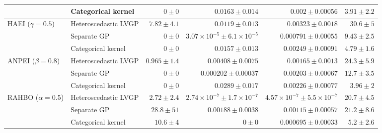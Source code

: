 \begin{table}[htbp]
\begin{tabular}{llrrrr}
 & Categorical kernel & \colorbox{green!20}{{\boldmath$0 \pm 0$}} & $0.0163 \pm 0.014$ & $0.002 \pm 0.00056$ & {\boldmath$3.91 \pm 2.2$} \\
\midrule
HAEI ($\gamma=0.5$) & Heteroscedastic LVGP & $7.82 \pm 4.1$ & $0.0119 \pm 0.013$ & $0.00323 \pm 0.0018$ & $30.6 \pm 5$ \\
 & Separate GP & \colorbox{green!20}{{\boldmath$0 \pm 0$}} & {\boldmath$3.07{\times}10^{-5} \pm 6.1{\times}10^{-5}$} & {\boldmath$0.000791 \pm 0.00055$} & $9.43 \pm 2.5$ \\
 & Categorical kernel & \colorbox{green!20}{{\boldmath$0 \pm 0$}} & $0.0157 \pm 0.013$ & $0.00249 \pm 0.00091$ & {\boldmath$4.79 \pm 1.6$} \\
\midrule
ANPEI ($\beta=0.8$) & Heteroscedastic LVGP & $0.965 \pm 1.4$ & $0.00408 \pm 0.0075$ & {\boldmath$0.00165 \pm 0.0013$} & $24.3 \pm 5.9$ \\
 & Separate GP & \colorbox{green!20}{{\boldmath$0 \pm 0$}} & {\boldmath$0.000202 \pm 0.00037$} & $0.00203 \pm 0.00067$ & $12.7 \pm 3.5$ \\
 & Categorical kernel & \colorbox{green!20}{{\boldmath$0 \pm 0$}} & $0.0289 \pm 0.017$ & $0.00226 \pm 0.00077$ & {\boldmath$3.96 \pm 2$} \\
\midrule
RAHBO ($\alpha=0.5$) & Heteroscedastic LVGP & {\boldmath$2.72 \pm 2.4$} & $2.74{\times}10^{-7} \pm 1.7{\times}10^{-7}$ & {\boldmath$4.57{\times}10^{-7} \pm 5.5{\times}10^{-7}$} & $20.7 \pm 4.5$ \\
 & Separate GP & $28.8 \pm 51$ & $0.00188 \pm 0.0038$ & $0.00115 \pm 0.00057$ & $21.2 \pm 8.6$ \\
 & Categorical kernel & $10.6 \pm 4$ & \colorbox{green!20}{{\boldmath$0 \pm 0$}} & $0.000695 \pm 0.00033$ & {\boldmath$5.2 \pm 2.6$} \\
\bottomrule
\end{tabular}
\end{table}
